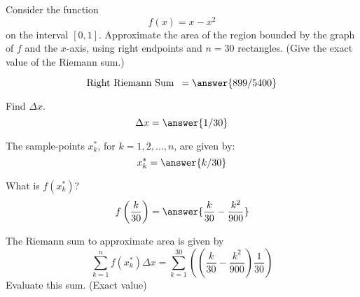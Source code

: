 \documentclass{ximera}
\author{Bobby Ramsey}
\begin{document}
Consider the function
\[
f(x) = x-x^2
\]
on the interval $[0,1]$.  Approximate the area of the region bounded by the graph of $f$ and the $x$-axis, using
right endpoints and $n=30$ rectangles.  (Give the exact value of the Riemann sum.)


\begin{exercise}
\[ \text{Right Riemann Sum }\, = \answer{899/5400} \]

\begin{hint}
	\begin{exercise}
	Find $\Delta x$.
	\[ \Delta x = \answer{1/30} \]

	\begin{exercise}
		The sample-points $x_k^*$, for $k = 1, 2, \ldots, n$, are given by:
		\[ x_k^* = \answer{k/30} \]

		\begin{exercise}
			What is $f( x_k^* )$?
			\[ f\left( \frac{k}{30} \right) = \answer{\frac{k}{30}-\frac{k^2}{900}} \]

			\begin{exercise}
				The Riemann sum to approximate area is given by
				\[ \sum_{k=1}^{n} f(x_k^*) \Delta x = \sum_{k=1}^{30} \left( \left( \frac{k}{30} - \frac{k^2}{900}\right) \frac{1}{30} \right)\]
				Evaluate this sum. (Exact value)

			\end{exercise}
		\end{exercise}
	\end{exercise}
	\end{exercise}
\end{hint}
\end{exercise}
\end{document}
